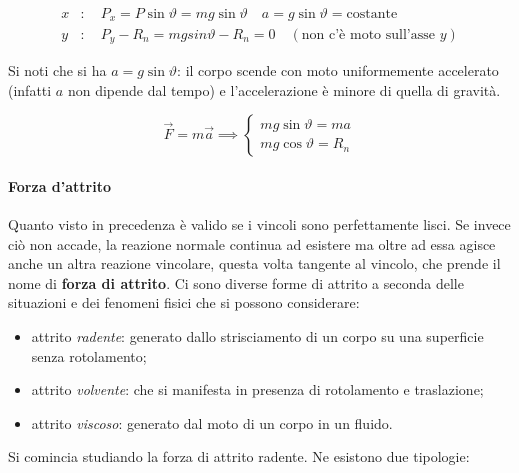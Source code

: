 \begin{align*}
	x&: \quad P_x=P\sin\vartheta=mg\sin\vartheta \quad a=g\sin\vartheta=\text{costante} \\
	y&: \quad P_y-R_n=mgsin\vartheta-R_n=0 \quad (\text{non c'è moto sull'asse $y$})
\end{align*}

Si noti che si ha $a=g\sin\vartheta$: il corpo scende con moto uniformemente accelerato (infatti $a$ non dipende dal tempo) e l'accelerazione è minore di quella di gravità.

\[
	\vec{F}=m\vec{a} \implies \begin{cases} mg\sin\vartheta=ma \\ mg\cos\vartheta=R_n \end{cases}
\]

\paragraph{Forza d'attrito} Quanto visto in precedenza è valido se i vincoli sono perfettamente lisci. Se invece ciò non accade, la reazione normale continua ad esistere ma oltre ad essa agisce anche un altra reazione vincolare, questa volta tangente al vincolo, che prende il nome di \textbf{forza di attrito}. Ci sono diverse forme di attrito a seconda delle situazioni e dei fenomeni fisici che si possono considerare:

\begin{itemize}
	\item attrito \emph{radente}: generato dallo strisciamento di un corpo su una superficie senza rotolamento;
	\item attrito \emph{volvente}: che si manifesta in presenza di rotolamento e traslazione;
	\item attrito \emph{viscoso}: generato dal moto di un corpo in un fluido.
\end{itemize}

Si comincia studiando la forza di attrito radente. Ne esistono due tipologie:

